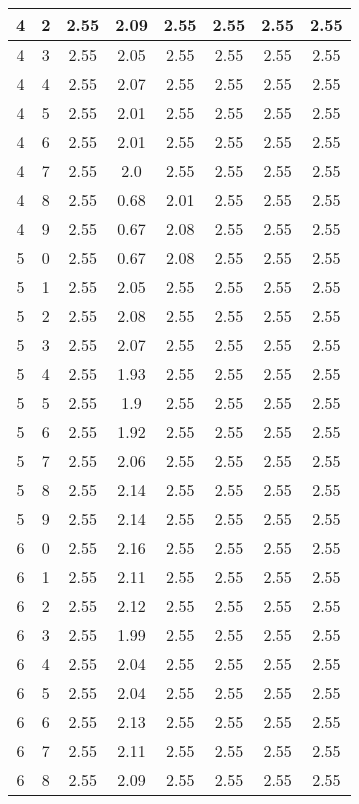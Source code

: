 \begin{longtable}{|c|c||c||c|c|c||c|c|}
	4 & 2 & 2.55 & 2.09 & 2.55 & 2.55 & 2.55 & 2.55 \\ \hline
	4 & 3 & 2.55 & 2.05 & 2.55 & 2.55 & 2.55 & 2.55 \\ \hline
	4 & 4 & 2.55 & 2.07 & 2.55 & 2.55 & 2.55 & 2.55 \\ \hline
	4 & 5 & 2.55 & 2.01 & 2.55 & 2.55 & 2.55 & 2.55 \\ \hline
	4 & 6 & 2.55 & 2.01 & 2.55 & 2.55 & 2.55 & 2.55 \\ \hline
	4 & 7 & 2.55 & 2.0 & 2.55 & 2.55 & 2.55 & 2.55 \\ \hline
	4 & 8 & 2.55 & 0.68 & 2.01 & 2.55 & 2.55 & 2.55 \\ \hline
	4 & 9 & 2.55 & 0.67 & 2.08 & 2.55 & 2.55 & 2.55 \\ \hline
	5 & 0 & 2.55 & 0.67 & 2.08 & 2.55 & 2.55 & 2.55 \\ \hline
	5 & 1 & 2.55 & 2.05 & 2.55 & 2.55 & 2.55 & 2.55 \\ \hline
	5 & 2 & 2.55 & 2.08 & 2.55 & 2.55 & 2.55 & 2.55 \\ \hline
	5 & 3 & 2.55 & 2.07 & 2.55 & 2.55 & 2.55 & 2.55 \\ \hline
	5 & 4 & 2.55 & 1.93 & 2.55 & 2.55 & 2.55 & 2.55 \\ \hline
	5 & 5 & 2.55 & 1.9 & 2.55 & 2.55 & 2.55 & 2.55 \\ \hline
	5 & 6 & 2.55 & 1.92 & 2.55 & 2.55 & 2.55 & 2.55 \\ \hline
	5 & 7 & 2.55 & 2.06 & 2.55 & 2.55 & 2.55 & 2.55 \\ \hline
	5 & 8 & 2.55 & 2.14 & 2.55 & 2.55 & 2.55 & 2.55 \\ \hline
	5 & 9 & 2.55 & 2.14 & 2.55 & 2.55 & 2.55 & 2.55 \\ \hline
	6 & 0 & 2.55 & 2.16 & 2.55 & 2.55 & 2.55 & 2.55 \\ \hline
	6 & 1 & 2.55 & 2.11 & 2.55 & 2.55 & 2.55 & 2.55 \\ \hline
	6 & 2 & 2.55 & 2.12 & 2.55 & 2.55 & 2.55 & 2.55 \\ \hline
	6 & 3 & 2.55 & 1.99 & 2.55 & 2.55 & 2.55 & 2.55 \\ \hline
	6 & 4 & 2.55 & 2.04 & 2.55 & 2.55 & 2.55 & 2.55 \\ \hline
	6 & 5 & 2.55 & 2.04 & 2.55 & 2.55 & 2.55 & 2.55 \\ \hline
	6 & 6 & 2.55 & 2.13 & 2.55 & 2.55 & 2.55 & 2.55 \\ \hline
	6 & 7 & 2.55 & 2.11 & 2.55 & 2.55 & 2.55 & 2.55 \\ \hline
	6 & 8 & 2.55 & 2.09 & 2.55 & 2.55 & 2.55 & 2.55 \\ \hline

\end{longtable}
